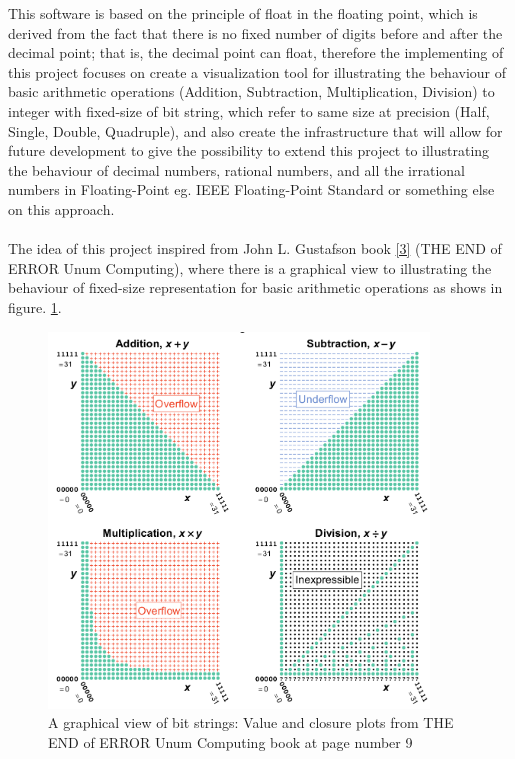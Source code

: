 \documentclass[11pt]{article}
\begin{document}
This software is based on the principle of float in the floating point, which is derived from the fact that there is no fixed number of digits before and after the decimal point; that is, the decimal point can float, therefore the implementing of this project focuses on create a visualization tool for illustrating the behaviour of basic arithmetic operations (Addition, Subtraction, Multiplication, Division) to integer with fixed-size of bit string, which refer to same size at precision (Half, Single, Double, Quadruple), and also create the infrastructure that will allow for future development to give the possibility to extend this project to illustrating the behaviour of decimal numbers, rational numbers, and all the irrational numbers in Floating-Point eg. IEEE Floating-Point Standard or something else on this approach.\\
\\The idea of this project inspired from John L. Gustafson book \ref{3} (THE END of ERROR Unum Computing), where there is a graphical view to illustrating the behaviour of fixed-size representation for basic arithmetic operations as shows in figure. \ref{book}.\\
\begin{figure}[h]
    \centering
    \includegraphics[width=0.9\textwidth]{book}
    \caption{A graphical view of bit strings: Value and closure plots from THE END of ERROR Unum Computing book at page number 9}
    \label{book}
\end{figure}
\newpage
\end{document}
